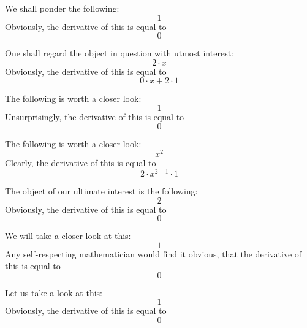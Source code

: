 \documentclass{article}
\begin{document}
We shall ponder the following:
\begin{equation}
1 
\end{equation}
Obviously, the derivative of this is equal to
\begin{equation}
0 
\end{equation}

One shall regard the object in question with utmost interest:
\begin{equation}
2 \cdot x 
\end{equation}
Obviously, the derivative of this is equal to
\begin{equation}
0 \cdot x + 2 \cdot 1 
\end{equation}

The following is worth a closer look:
\begin{equation}
1 
\end{equation}
Unsurprisingly, the derivative of this is equal to
\begin{equation}
0 
\end{equation}

The following is worth a closer look:
\begin{equation}
x ^{2 } 
\end{equation}
Clearly, the derivative of this is equal to
\begin{equation}
2 \cdot x ^{2 - 1 } \cdot 1 
\end{equation}

The object of our ultimate interest is the following:
\begin{equation}
2 
\end{equation}
Obviously, the derivative of this is equal to
\begin{equation}
0 
\end{equation}

We will take a closer look at this:
\begin{equation}
1 
\end{equation}
Any self-respecting mathematician would find it obvious, that the derivative of this is equal to
\begin{equation}
0 
\end{equation}

Let us take a look at this:
\begin{equation}
1 
\end{equation}
Obviously, the derivative of this is equal to
\begin{equation}
0 
\end{equation}
\end{document}
